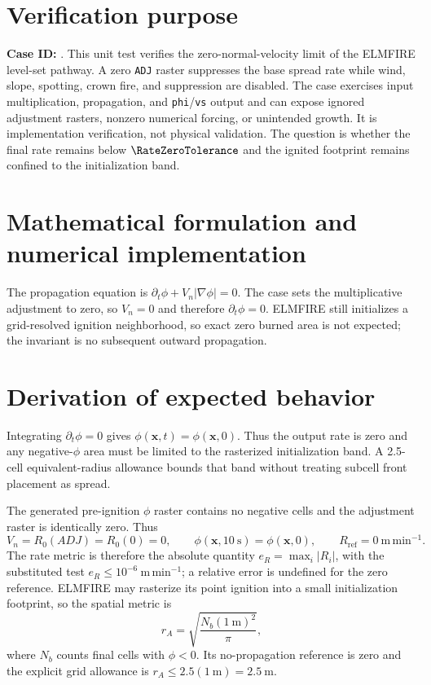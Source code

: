 \section{Verification purpose}

\textbf{Case ID:} \texttt{\CaseID}. This unit test verifies the zero-normal-velocity limit of the ELMFIRE level-set pathway. A zero \texttt{ADJ} raster suppresses the base spread rate while wind, slope, spotting, crown fire, and suppression are disabled. The case exercises input multiplication, propagation, and \texttt{phi}/\texttt{vs} output and can expose ignored adjustment rasters, nonzero numerical forcing, or unintended growth. It is implementation verification, not physical validation. The question is whether the final rate remains below \(\RateZeroTolerance\) and the ignited footprint remains confined to the initialization band.

\section{Mathematical formulation and numerical implementation}

The propagation equation is \(\partial_t\phi+V_n|\nabla\phi|=0\). The case sets the multiplicative adjustment to zero, so \(V_n=0\) and therefore \(\partial_t\phi=0\). ELMFIRE still initializes a grid-resolved ignition neighborhood, so exact zero burned area is not expected; the invariant is no subsequent outward propagation.

\section{Derivation of expected behavior}

Integrating \(\partial_t\phi=0\) gives \(\phi(\mathbf{x},t)=\phi(\mathbf{x},0)\). Thus the output rate is zero and any negative-\(\phi\) area must be limited to the rasterized initialization band. A 2.5-cell equivalent-radius allowance bounds that band without treating subcell front placement as spread.

The generated pre-ignition \(\phi\) raster contains no negative cells and
the adjustment raster is identically zero.  Thus
\[
 V_n=R_0(ADJ)=R_0(0)=0,\qquad
 \phi(\mathbf{x},10~\mathrm{s})=\phi(\mathbf{x},0),
 \qquad R_{\mathrm{ref}}=0~\mathrm{m\,min^{-1}}.
\]
The rate metric is therefore the absolute quantity
\(e_R=\max_i|R_i|\), with the substituted test
\(e_R\leq10^{-6}~\mathrm{m\,min^{-1}}\); a relative error is undefined
for the zero reference.  ELMFIRE may rasterize its point ignition into a
small initialization footprint, so the spatial metric is
\[
 r_A=\sqrt{\frac{N_b(1~\mathrm{m})^2}{\pi}},
\]
where \(N_b\) counts final cells with \(\phi<0\).  Its no-propagation
reference is zero and the explicit grid allowance is
\(r_A\leq2.5(1~\mathrm{m})=2.5~\mathrm{m}\).

